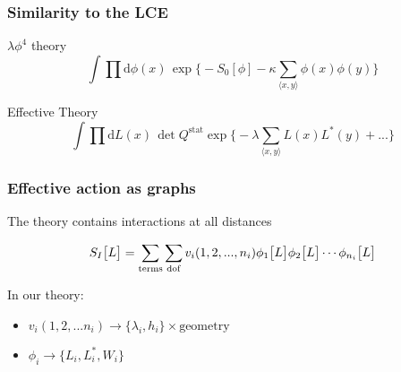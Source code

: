\documentclass[12pt,a4paper,dvipsnames,usenames]{beamer}
\begin{document}
\begin{frame}
  \frametitle{Similarity to the LCE}

  \begin{block}{$\lambda \phi^4$ theory}
    \[
      \int \prod \mathrm{d} \phi(x) \, \exp \bigg\{ -S_0[\phi] - \kappa \sum_{\langle x,y \rangle}
      \phi(x) \phi(y) \bigg\}
    \]
  \end{block}

  \vspace{.5cm}

  \begin{block}{Effective Theory}
    \[
      \int \prod \mathrm{d} L(x) \, \det Q^{\mathrm{stat}} \exp \bigg\{ \minus \lambda \sum_{\langle x, y \rangle} L(x) L^*(y) + ... \bigg\}
    \]
  \end{block}
  
\end{frame}

\begin{frame}
  \frametitle{Effective action as graphs}

  The theory contains interactions at all distances

  \vspace{.5em}

  \begin{block}{}
    \[
      S_I\big[ L \big] = \sum_{\vphantom{d}\mathrm{terms}} \sum_{\mathrm{dof}} v_i(1,2,...,n_i) \phi_1 \big[L\big] \phi_2 \big[L\big] \cdots
      \phi_{n_i} \big[ L \big]
    \]
  \end{block}

  \vspace{.5cm}

  {\color{LightUIRed} In our theory:}

  \vspace{.2cm}
  \begin{itemize}
    \setlength\itemsep{1em}
    \item $v_i(1,2,...n_i) \to \big\{ \lambda_i, h_i \big\} \times \mathrm{geometry}$
    \item $\phi_i \to \big\{ L_i, L_i^*, W_i \big\}$
  \end{itemize}
  
\end{frame}
\end{document}
